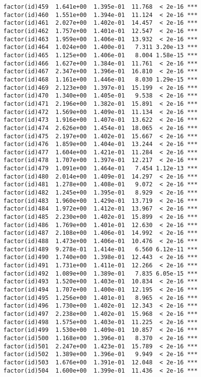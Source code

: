 \documentclass[]{article}
\begin{document}
\begin{verbatim}
factor(id)459  1.641e+00  1.395e-01  11.768  < 2e-16 ***
factor(id)460  1.551e+00  1.394e-01  11.124  < 2e-16 ***
factor(id)461  2.027e+00  1.402e-01  14.457  < 2e-16 ***
factor(id)462  1.757e+00  1.401e-01  12.547  < 2e-16 ***
factor(id)463  1.959e+00  1.406e-01  13.932  < 2e-16 ***
factor(id)464  1.024e+00  1.400e-01   7.311 3.20e-13 ***
factor(id)465  1.125e+00  1.406e-01   8.004 1.58e-15 ***
factor(id)466  1.627e+00  1.384e-01  11.761  < 2e-16 ***
factor(id)467  2.347e+00  1.396e-01  16.810  < 2e-16 ***
factor(id)468  1.161e+00  1.446e-01   8.030 1.29e-15 ***
factor(id)469  2.123e+00  1.397e-01  15.199  < 2e-16 ***
factor(id)470  1.340e+00  1.405e-01   9.538  < 2e-16 ***
factor(id)471  2.196e+00  1.382e-01  15.891  < 2e-16 ***
factor(id)472  1.569e+00  1.409e-01  11.134  < 2e-16 ***
factor(id)473  1.916e+00  1.407e-01  13.622  < 2e-16 ***
factor(id)474  2.626e+00  1.454e-01  18.065  < 2e-16 ***
factor(id)475  2.197e+00  1.402e-01  15.667  < 2e-16 ***
factor(id)476  1.859e+00  1.404e-01  13.244  < 2e-16 ***
factor(id)477  1.604e+00  1.421e-01  11.284  < 2e-16 ***
factor(id)478  1.707e+00  1.397e-01  12.217  < 2e-16 ***
factor(id)479  1.091e+00  1.464e-01   7.454 1.12e-13 ***
factor(id)480  2.014e+00  1.409e-01  14.297  < 2e-16 ***
factor(id)481  1.278e+00  1.408e-01   9.072  < 2e-16 ***
factor(id)482  1.245e+00  1.395e-01   8.929  < 2e-16 ***
factor(id)483  1.960e+00  1.429e-01  13.719  < 2e-16 ***
factor(id)484  1.972e+00  1.412e-01  13.967  < 2e-16 ***
factor(id)485  2.230e+00  1.402e-01  15.899  < 2e-16 ***
factor(id)486  1.769e+00  1.401e-01  12.630  < 2e-16 ***
factor(id)487  2.108e+00  1.406e-01  14.992  < 2e-16 ***
factor(id)488  1.473e+00  1.406e-01  10.476  < 2e-16 ***
factor(id)489  9.278e-01  1.414e-01   6.560 6.12e-11 ***
factor(id)490  1.740e+00  1.398e-01  12.443  < 2e-16 ***
factor(id)491  1.731e+00  1.411e-01  12.266  < 2e-16 ***
factor(id)492  1.089e+00  1.389e-01   7.835 6.05e-15 ***
factor(id)493  1.520e+00  1.403e-01  10.834  < 2e-16 ***
factor(id)494  1.707e+00  1.400e-01  12.195  < 2e-16 ***
factor(id)495  1.256e+00  1.401e-01   8.965  < 2e-16 ***
factor(id)496  1.730e+00  1.402e-01  12.343  < 2e-16 ***
factor(id)497  2.238e+00  1.402e-01  15.968  < 2e-16 ***
factor(id)498  1.575e+00  1.403e-01  11.225  < 2e-16 ***
factor(id)499  1.530e+00  1.409e-01  10.857  < 2e-16 ***
factor(id)500  1.168e+00  1.396e-01   8.370  < 2e-16 ***
factor(id)501  2.247e+00  1.423e-01  15.789  < 2e-16 ***
factor(id)502  1.389e+00  1.396e-01   9.949  < 2e-16 ***
factor(id)503  1.676e+00  1.391e-01  12.048  < 2e-16 ***
factor(id)504  1.600e+00  1.399e-01  11.436  < 2e-16 ***

\end{verbatim}
\end{document}

